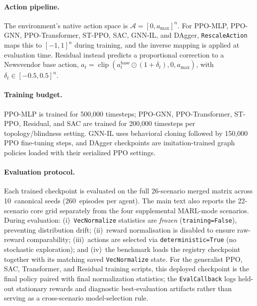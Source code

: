 \documentclass[10pt,a4paper]{article}
\begin{document}
\paragraph{Action pipeline.}
The environment's native action space is
$\mathcal{A} = [0, a_{\max}]^{n}$.
For PPO-MLP, PPO-GNN, PPO-Transformer, ST-PPO, SAC, GNN-IL, and
DAgger, \texttt{RescaleAction} maps this to $[-1,1]^n$ during training,
and the inverse mapping is applied at evaluation time. Residual instead
predicts a proportional correction to a Newsvendor base action,
$a_t=\operatorname{clip}(a_t^{\mathrm{base}}\odot(1+\delta_t),0,a_{\max})$,
with $\delta_t\in[-0.5,0.5]^n$.

\paragraph{Training budget.}
PPO-MLP is trained for 500{,}000 timesteps; PPO-GNN,
PPO-Transformer, ST-PPO, Residual, and SAC are trained for
200{,}000 timesteps per topology/blindness setting. GNN-IL uses
behavioral cloning followed by 150{,}000 PPO fine-tuning steps, and
DAgger checkpoints are imitation-trained graph policies loaded with
their serialized PPO settings.

\paragraph{Evaluation protocol.}
Each trained checkpoint is evaluated on the full 26-scenario merged
matrix across 10~canonical seeds (260~episodes per agent). The main
text also reports the 22-scenario core grid separately from the four
supplemental MARL-mode scenarios. During evaluation:
(i)~\texttt{VecNormalize} statistics are \emph{frozen}
(\texttt{training=False}), preventing distribution drift;
(ii)~reward normalisation is disabled to ensure raw-reward comparability;
(iii)~actions are selected via \texttt{deterministic=True}
(no stochastic exploration); and
(iv)~the benchmark loads the registry checkpoint together with its
matching saved \texttt{VecNormalize} state. For the generalist PPO, SAC,
Transformer, and Residual training scripts, this deployed checkpoint is
the final policy paired with final normalization statistics; the
\texttt{EvalCallback} logs held-out stationary rewards and diagnostic
best-evaluation artifacts rather than serving as a cross-scenario
model-selection rule.
\end{document}
